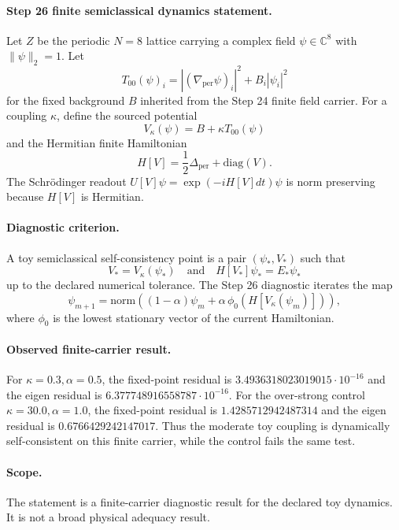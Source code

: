\paragraph{Step 26 finite semiclassical dynamics statement.}
Let \(Z\) be the periodic \(N=8\) lattice carrying a complex field
\(\psi \in \mathbb{C}^{8}\) with \(\|\psi\|_2=1\).  Let
\[
T_{00}(\psi)_i
  =
  |(\nabla_{\mathrm{per}}\psi)_i|^2
  +
  B_i |\psi_i|^2
\]
for the fixed background \(B\) inherited from the Step 24 finite field
carrier.  For a coupling \(\kappa\), define the sourced potential
\[
V_\kappa(\psi)=B+\kappa T_{00}(\psi)
\]
and the Hermitian finite Hamiltonian
\[
H[V] = \frac12 \Delta_{\mathrm{per}} + \mathrm{diag}(V).
\]
The Schrödinger readout \(U[V]\psi=\exp(-iH[V]dt)\psi\) is norm
preserving because \(H[V]\) is Hermitian.

\paragraph{Diagnostic criterion.}
A toy semiclassical self-consistency point is a pair
\((\psi_\ast,V_\ast)\) such that
\[
V_\ast = V_\kappa(\psi_\ast)
\quad\text{and}\quad
H[V_\ast]\psi_\ast = E_\ast\psi_\ast
\]
up to the declared numerical tolerance.  The Step 26 diagnostic iterates
the map
\[
\psi_{m+1}
  =
  \mathrm{norm}\!\left((1-\alpha)\psi_m
    + \alpha\,\phi_0(H[V_\kappa(\psi_m)])\right),
\]
where \(\phi_0\) is the lowest stationary vector of the current Hamiltonian.

\paragraph{Observed finite-carrier result.}
For \(\kappa=0.3,\alpha=0.5\), the fixed-point residual is
\(3.4936318023019015\cdot 10^{-16}\) and the eigen residual is
\(6.377748916558787\cdot 10^{-16}\).  For the over-strong control
\(\kappa=30.0,\alpha=1.0\), the fixed-point residual is
\(1.4285712942487314\) and the eigen residual is \(0.6766429242147017\).
Thus the moderate toy coupling is dynamically self-consistent on this
finite carrier, while the control fails the same test.

\paragraph{Scope.}
The statement is a finite-carrier diagnostic result for the declared toy
dynamics.  It is not a broad physical adequacy result.
